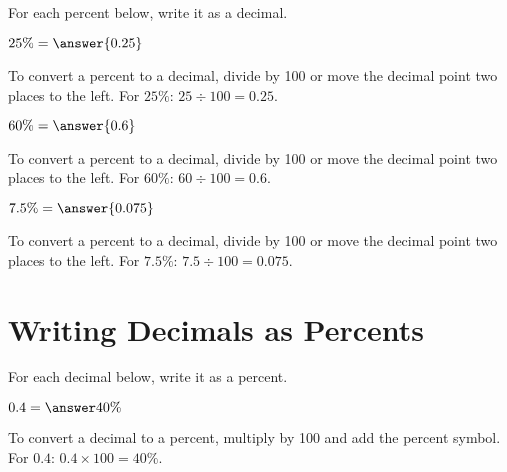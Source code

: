 \documentclass{ximera}
\begin{document}
For each percent below, write it as a decimal.


\begin{problem}
$25\% = \answer{0.25}$

\begin{feedback}
To convert a percent to a decimal, divide by 100 or move the decimal point two places to the left. For $25\%$: $25 \div 100 = 0.25$.
\end{feedback}

\end{problem}

\begin{problem}
$60\% = \answer{0.6}$

\begin{feedback}
To convert a percent to a decimal, divide by 100 or move the decimal point two places to the left. For $60\%$: $60 \div 100 = 0.6$.
\end{feedback}

\end{problem}

\begin{problem}
$7.5\% = \answer{0.075}$

\begin{feedback}
To convert a percent to a decimal, divide by 100 or move the decimal point two places to the left. For $7.5\%$: $7.5 \div 100 = 0.075$.
\end{feedback}

\end{problem}



\section*{Writing Decimals as Percents}

For each decimal below, write it as a percent.


\begin{problem}
$0.4 = \answer{40\%}$

\begin{feedback}
To convert a decimal to a percent, multiply by 100 and add the percent symbol. For $0.4$: $0.4 \times 100 = 40\%$.
\end{feedback}

\end{problem}
\end{document}
